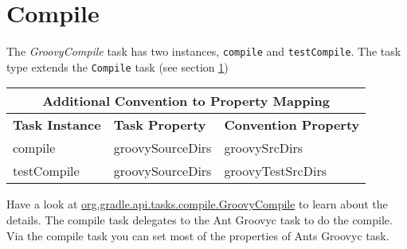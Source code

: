 \section{Compile} %
\label{sec:compile}
The \emph{GroovyCompile} task has two instances, \texttt{compile} and \texttt{testCompile}. The task type extends the \texttt{Compile} task (see section \ref{sec:compile})
\begin{center}
	\begin{tabular}{|l|l|l|} \hline
		\multicolumn{3}{|c|}{Additional Convention to Property Mapping} \\ \hline
		\textbf{Task Instance} & \textbf{Task Property} & \textbf{Convention Property} \\ \hline
		compile & groovySourceDirs & groovySrcDirs \\ \hline
		testCompile & groovySourceDirs & groovyTestSrcDirs \\ \hline
	\end{tabular} 
\end{center}
Have a look at \href{\API tasks/compile/GroovyCompile.html}{org.gradle.api.tasks.compile.GroovyCompile} to learn about the details. The compile task delegates to the Ant Groovyc task to do the compile. Via the compile task you can set most of the properties of Ants Groovyc task. 

